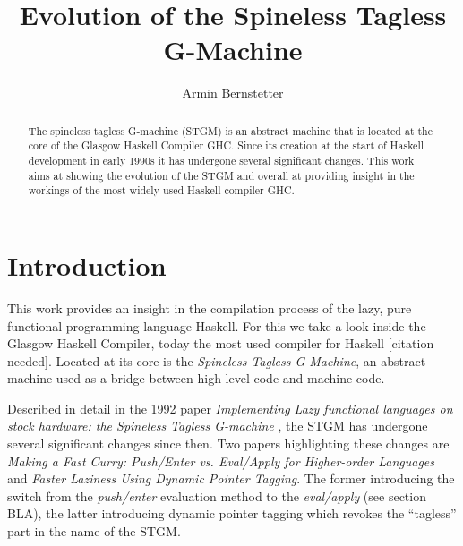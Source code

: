 \documentclass[runningheads]{llncs}
\begin{document}
%
\title{Evolution of the Spineless Tagless G-Machine}
%
%
\author{Armin Bernstetter}
%
%
%
\maketitle              %
%
\begin{abstract}
The spineless tagless G-machine (STGM) is an abstract machine that is located at the core of the Glasgow Haskell Compiler GHC. Since its creation at the start of Haskell development in early 1990s it has undergone several significant changes. This work aims at showing the evolution of the STGM and overall at providing insight in the workings of the most widely-used Haskell compiler GHC.

\end{abstract}
%
%
%

\section{Introduction}

This work provides an insight in the compilation process of the lazy, pure functional programming language Haskell. For this we take a look inside the Glasgow Haskell Compiler, today the most used compiler for Haskell [citation needed]. Located at its core is the \textit{Spineless Tagless G-Machine}, an abstract machine used as a bridge between high level code and machine code.

Described in detail in the 1992 paper \textit{Implementing Lazy functional languages on stock hardware: the Spineless Tagless G-machine} \cite{jones1992implementing}, the STGM has undergone several significant changes since then. Two papers highlighting these changes are \textit{Making a Fast Curry: Push/Enter vs.
Eval/Apply for Higher-order Languages}\cite{marlow2004making} and \textit{Faster Laziness Using Dynamic Pointer Tagging}\cite{marlow2007faster}. The former introducing the switch from the \textit{push/enter} evaluation method to the \textit{eval/apply} (see section BLA), the latter introducing dynamic pointer tagging which revokes the \enquote{tagless} part in the name of the STGM.
\end{document}
